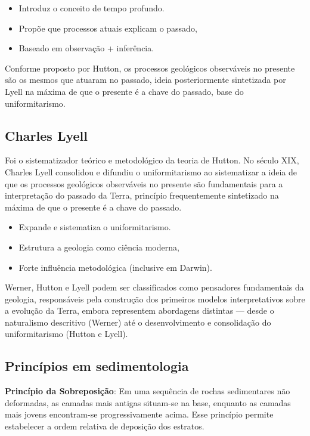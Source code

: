 \begin{itemize}[label=$\diamond$]
    \item Introduz o conceito de tempo profundo.
    \item Propõe que processos atuais explicam o passado,
    \item Baseado em observação + inferência.
\end{itemize}

Conforme proposto por Hutton, os processos geológicos observáveis no presente são os mesmos que atuaram no passado, ideia posteriormente sintetizada por Lyell na máxima de que o presente é a chave do passado, base do uniformitarismo.

\subsection{Charles Lyell}
Foi o sistematizador teórico e metodológico da teoria de Hutton. No século XIX, Charles Lyell consolidou e difundiu o uniformitarismo ao sistematizar a ideia de que os processos geológicos observáveis no presente são fundamentais para a interpretação do passado da Terra, princípio frequentemente sintetizado na máxima de que o presente é a chave do passado.

\begin{itemize}[label=$\diamond$]
    \item Expande e sistematiza o uniformitarismo.
    \item Estrutura a geologia como ciência moderna,
    \item Forte influência metodológica (inclusive em Darwin).
\end{itemize}

Werner, Hutton e Lyell podem ser classificados como pensadores fundamentais da geologia, responsáveis pela construção dos primeiros modelos interpretativos sobre a evolução da Terra, embora representem abordagens distintas — desde o naturalismo descritivo (Werner) até o desenvolvimento e consolidação do uniformitarismo (Hutton e Lyell).

\subsection{Princípios em sedimentologia}

\begin{definicao}
\textbf{Princípio da Sobreposição}: Em uma sequência de rochas sedimentares não deformadas, as camadas mais antigas situam-se na base, enquanto as camadas mais jovens encontram-se progressivamente acima. Esse princípio permite estabelecer a ordem relativa de deposição dos estratos.
\end{definicao}

